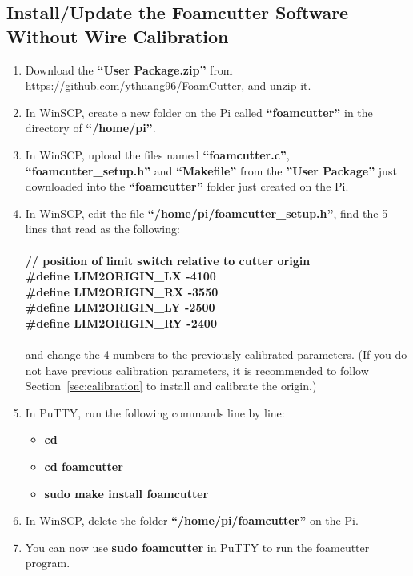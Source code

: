 \documentclass[titlepage,12pt,letter]{report}
\numberwithin{equation}{chapter}
\begin{document}
\subsection{Install/Update the Foamcutter Software Without Wire Calibration}
\label{sec:install}
\begin{enumerate}[itemsep = 5pt,topsep=0pt]
\item Download the \textbf{``User Package.zip''} from \href{https://github.com/ythuang96/FoamCutter}{https://github.com/ythuang96/FoamCutter}, and unzip it.
\item In WinSCP, create a new folder on the Pi called \textbf{``foamcutter''} in the directory of \textbf{``/home/pi''}. 
\item In WinSCP, upload the files named \textbf{``foamcutter.c''}, \textbf{``foamcutter\_setup.h''} and \textbf{``Makefile''} from the \textbf{''User Package''} just downloaded into the \textbf{``foamcutter''} folder just created on the Pi.
\item In WinSCP, edit the file \textbf{``/home/pi/foamcutter\_setup.h''}, find the 5 lines that read as the following:\\ \\
\textbf{// position of limit switch relative to cutter origin}\\
\textbf{\#define LIM2ORIGIN\_LX -4100}\\
\textbf{\#define LIM2ORIGIN\_RX -3550}\\
\textbf{\#define LIM2ORIGIN\_LY -2500}\\
\textbf{\#define LIM2ORIGIN\_RY -2400}\\ \\
and change the 4 numbers to the previously calibrated parameters. (If you do not have previous calibration parameters, it is recommended to follow Section~\ref{sec:calibration} to install and calibrate the origin.)
\item In PuTTY, run the following commands line by line:
\begin{itemize}[noitemsep,topsep=0pt]
	\item \textbf{cd}
	\item \textbf{cd foamcutter}
	\item \textbf{sudo make install foamcutter}
\end{itemize}
\item In WinSCP, delete the folder \textbf{``/home/pi/foamcutter''} on the Pi.
\item You can now use \textbf{sudo foamcutter} in PuTTY to run the foamcutter program.
\end{enumerate}
\end{document}
